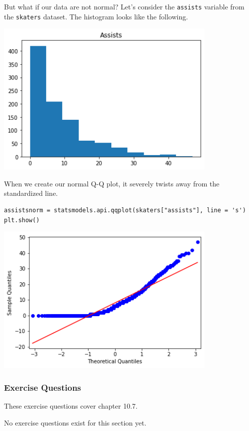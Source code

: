 But what if our data are not normal? Let's consider the \verb|assists| variable from the \verb|skaters| dataset. The histogram looks like the following.

\includegraphics[width = 0.8\textwidth]{img/hist2.png}

When we create our normal Q-Q plot, it severely twists away from the standardized line.\par
\begin{lstlisting}[style=pippython]
assistsnorm = statsmodels.api.qqplot(skaters["assists"], line = 's')
plt.show()
\end{lstlisting}

\includegraphics[width = 0.8\textwidth]{img/hist8.png}

\subsubsection*{Exercise Questions}
These exercise questions cover chapter 10.7.

No exercise questions exist for this section yet.
